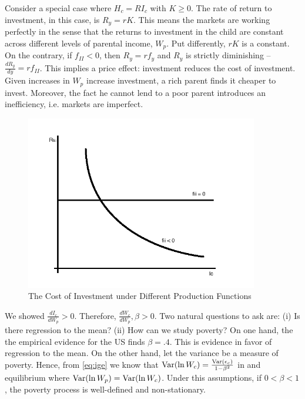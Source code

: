 \indent Consider a special case where $H_{c} = R I_{c}$ with $K \geq 0$. The rate of return to investment, in this case, is $R_{y} = rK$. This means the markets are working perfectly in the sense that the returns to investment in the child are constant across different levels of parental income, $W_{p}$. Put differently, $rK$ is a constant. On the contrary, if $f_{II} < 0$, then $R_{y} = r f_{y}$ and $R_{y}$ is strictly diminishing --$\frac{d R_{y}}{ d y} = r f_{II}$. This implies a price effect: investment reduces the cost of investment. Given increases in $W_{p}$ increase investment, a rich parent finds it cheaper to invest. Moreover, the fact he cannot lend to a poor parent introduces an inefficiency, i.e. markets are imperfect.

\begin{center}
\begin{figure}[H] 
\caption{The Cost of Investment under Different Production Functions}
\centering
\includegraphics[width=4in, height=3in]{Plots/Rets.png}
\end{figure}
\end{center}

\indent We showed $\frac{d I_{c}}{d W_{p}} > 0$. Therefore, $\frac{d W_{c}}{d W_{p}}, \beta > 0 $. Two natural questions to ask are: (i) Is there regression to the mean? (ii) How can we study poverty? On one hand, the the empirical evidence for the US finds $\beta = .4$. This is evidence in favor of regression to the mean. On the other hand, let the variance be a measure of poverty. Hence, from \eqref{eq:ige} we know that $\operatorname{Var} (\ln W_{c}) = \frac{\operatorname{Var} (\epsilon_{c})}{1 - \beta^2}$ in and equilibrium where $\operatorname{Var} (\ln W_{p})  = \operatorname{Var} (\ln W_{c}) $. Under this assumptions, if $0 < \beta < 1$, the poverty process is well-defined and non-stationary. 

